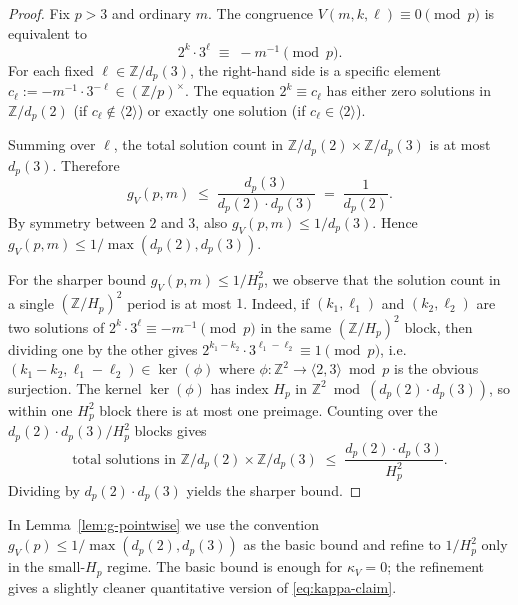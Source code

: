 \begin{proof}
Fix $p > 3$ and ordinary $m$. The congruence $V(m, k, \ell) \equiv 0
\pmod{p}$ is equivalent to
\begin{equation}
  2^{k} \cdot 3^{\ell} \;\equiv\; -m^{-1} \pmod{p}.
\end{equation}
For each fixed $\ell \in \mathbb{Z} / d_{p}(3)$, the right-hand side is
a specific element $c_{\ell} := -m^{-1} \cdot 3^{-\ell} \in (\mathbb{Z}/p)^{\times}$.
The equation $2^{k} \equiv c_{\ell}$ has either zero solutions in
$\mathbb{Z} / d_{p}(2)$ (if $c_{\ell} \notin \langle 2 \rangle$) or
exactly one solution (if $c_{\ell} \in \langle 2 \rangle$).

Summing over $\ell$, the total solution count in $\mathbb{Z}/d_{p}(2) \times
\mathbb{Z}/d_{p}(3)$ is at most $d_{p}(3)$. Therefore
\begin{equation}
  g_{V}(p, m) \;\leq\; \frac{d_{p}(3)}{d_{p}(2) \cdot d_{p}(3)}
  \;=\; \frac{1}{d_{p}(2)}.
\end{equation}
By symmetry between $2$ and $3$, also $g_{V}(p, m) \leq 1/d_{p}(3)$.
Hence $g_{V}(p, m) \leq 1/\max(d_{p}(2), d_{p}(3))$.

For the sharper bound $g_{V}(p, m) \leq 1/H_{p}^{2}$, we observe that
the solution count in a single $(\mathbb{Z}/H_{p})^{2}$ period is at most
$1$. Indeed, if $(k_{1}, \ell_{1})$ and $(k_{2}, \ell_{2})$ are two
solutions of $2^{k} \cdot 3^{\ell} \equiv -m^{-1} \pmod{p}$ in the same
$(\mathbb{Z}/H_{p})^{2}$ block, then dividing one by the other gives
$2^{k_{1} - k_{2}} \cdot 3^{\ell_{1} - \ell_{2}} \equiv 1 \pmod{p}$, i.e.\
$(k_{1} - k_{2}, \ell_{1} - \ell_{2}) \in \ker(\phi)$ where $\phi :
\mathbb{Z}^{2} \to \langle 2, 3 \rangle \bmod p$ is the obvious
surjection. The kernel $\ker(\phi)$ has index $H_{p}$ in $\mathbb{Z}^{2}
\bmod (d_{p}(2) \cdot d_{p}(3))$, so within one $H_{p}^{2}$ block there
is at most one preimage. Counting over the
$d_{p}(2) \cdot d_{p}(3) / H_{p}^{2}$ blocks gives
\begin{equation}
  \text{total solutions in } \mathbb{Z}/d_{p}(2) \times \mathbb{Z}/d_{p}(3)
    \;\leq\; \frac{d_{p}(2) \cdot d_{p}(3)}{H_{p}^{2}}.
\end{equation}
Dividing by $d_{p}(2) \cdot d_{p}(3)$ yields the sharper bound.
\end{proof}

\begin{remark}
In Lemma~\ref{lem:g-pointwise} we use the convention
$g_{V}(p) \leq 1/\max(d_{p}(2), d_{p}(3))$ as the basic bound and refine
to $1/H_{p}^{2}$ only in the small-$H_{p}$ regime. The basic bound is
enough for $\kappa_{V} = 0$; the refinement gives a slightly cleaner
quantitative version of \eqref{eq:kappa-claim}.
\end{remark}

